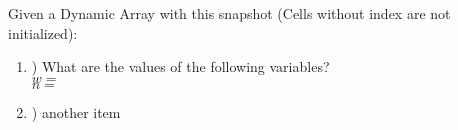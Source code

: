 \documentclass[12pt]{article}
\begin{document}
    \noindent
    Given a Dynamic Array with this snapshot (Cells without index are not initialized):\\
    \begin{enumerate}[label=\alph*]
        \item) What are the values of the following variables?\\
        $w = $\\
        $n = $
        \item) another item
    \end{enumerate}
\end{document}
